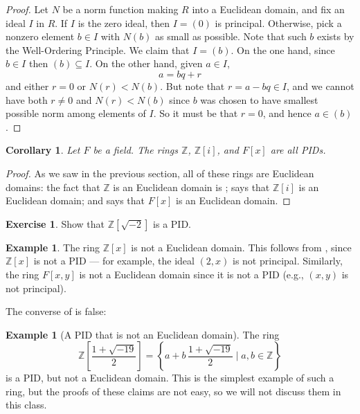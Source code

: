 \documentclass[12pt]{report}
\newtheorem{corollary}[theorem]{Corollary}
\numberwithin{equation}{section}
\numberwithin{theorem}{chapter}
\theoremstyle{definition}
\newtheorem{example}[theorem]{Example}
\newtheorem{exercise}{Exercise}
\newtheorem*{basic properties}{Basic Properties}
\newtheorem*{Important Remark}{Important Remark}
\begin{document}
\begin{proof} 
Let $N$ be a norm function making $R$ into a Euclidean domain, and fix an ideal $I$ in $R$. If $I$ is the zero ideal, then $I = (0)$ is principal.
 Otherwise, pick a nonzero element $b \in I$ with $N(b)$ as small as possible. Note that such $b$ exists by the Well-Ordering Principle. We claim that $I = (b)$. On the one hand, since $b \in I$ then $(b) \subseteq I$. On the other hand, given $a \in I$,
$$a = bq + r$$
and either $r = 0$ or $N(r) < N(b)$. But note that $r = a - bq \in I$, and we cannot have both $r \neq 0$ and $N(r) < N(b)$ since $b$ was chosen to have smallest possible norm among elements of $I$.
So it must be that $r = 0$, and hence $a \in (b)$.
\end{proof}



\begin{corollary} 
Let $F$ be a field.
The rings $\mathbb{Z}$, $\mathbb{Z}[i]$, and $F[x]$  are all PIDs.
\end{corollary}

\begin{proof}
	As we saw in the previous section, all of these rings are Euclidean domains: the fact that $\mathbb{Z}$ is an Euclidean domain is ;  says that $\mathbb{Z}[i]$ is an Euclidean domain; and  says that $F[x]$ is an Euclidean domain.
\end{proof}


\begin{exercise}
	Show that $\mathbb{Z}[\sqrt{-2}]$ is a PID.
\end{exercise}


\begin{example}
The ring $\mathbb{Z}[x]$ is not a Euclidean domain. This follows from , since $\mathbb{Z}[x]$ is not a PID --- for example, the ideal $(2,x)$ is not principal. Similarly, the ring $F[x,y]$ is not a Euclidean domain since it is not a PID (e.g., $(x,y)$ is not principal). 
\end{example}



The converse of  is false:



\begin{example}[A PID that is not an Euclidean domain]
The ring 
$$\mathbb{Z}\left[ \frac{1 + \sqrt{-19}}{2}\right]=\left\{a+ b \, \frac{1 + \sqrt{-19}}{2} \mid a,b\in \mathbb{Z}\right\}$$ 
is a PID, but not a Euclidean domain. This is the simplest example of such a ring, but the proofs of these claims are not easy, so we will not discuss them in this class.
\end{example}
\end{document}
